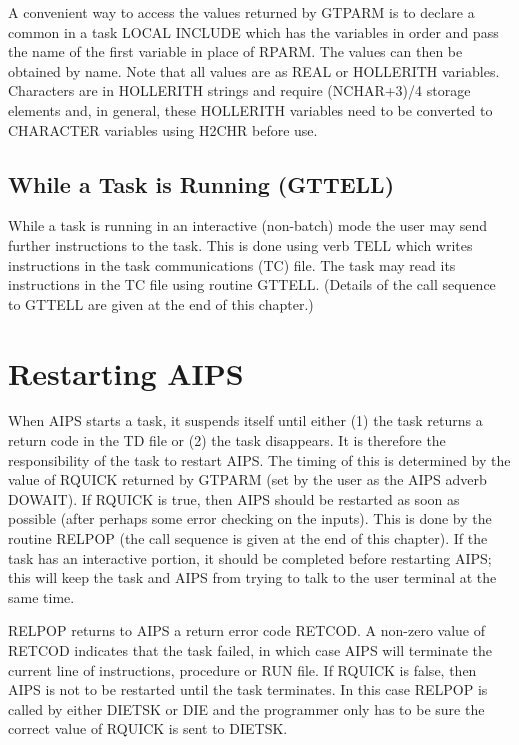 A convenient way to access the values returned by GTPARM is to declare
a common in a task LOCAL INCLUDE which has the variables in order and
pass the name of the first variable in place of RPARM.  The values can
then be obtained by name.  Note that all values are as REAL or
HOLLERITH variables.  Characters are in HOLLERITH strings and require
(NCHAR+3)/4 storage elements and, in general, these HOLLERITH variables
need to be converted to CHARACTER variables using H2CHR before use.


\subsection{While a Task is Running (GTTELL)}
While a task is running in an interactive (non-batch) mode the user
may send further instructions to the task.  This is done using verb
TELL which writes instructions in the task communications (TC) file.
The task may read its instructions in the TC file using routine
GTTELL.  (Details of the call sequence to GTTELL are given at the end
of this chapter.)



\section{Restarting AIPS}
When AIPS starts a task, it suspends itself until either (1) the task
returns a return code in the TD file or (2) the task disappears. It is
therefore the responsibility of the task to restart AIPS.  The timing
of this is determined by the value of RQUICK returned by GTPARM (set
by the user as the AIPS adverb DOWAIT).  If RQUICK is true, then AIPS
should be restarted as soon as possible (after perhaps some error
checking on the inputs).  This is done by the routine RELPOP (the
call sequence is given at the end of this chapter).  If the task has
an interactive portion, it should be completed before restarting AIPS;
this will keep the task and AIPS from trying to talk to the user
terminal at the same time.

RELPOP returns to AIPS a return error code RETCOD.  A non-zero value
of RETCOD indicates  that the task failed, in which case AIPS will
terminate the current line of instructions, procedure or RUN file.  If
RQUICK is false, then AIPS is not to be restarted until the task
terminates.  In this case RELPOP is called by either DIETSK or DIE
and the programmer only has to be sure the correct value of RQUICK is
sent to DIETSK.


